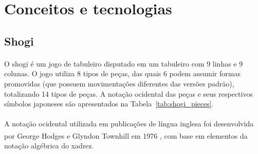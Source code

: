 \documentclass[a4paper, 11pt]{article}
\begin{document}
    \section{Conceitos e tecnologias}
    \subsection[Shogi]{Shogi}
    \paragraph{}
    O shogi é um jogo de tabuleiro disputado em um tabuleiro com 9 linhas e 9 colunas. O jogo utiliza 8 tipos de peças, das quais 6 podem assumir formas promovidas (que possuem movimentações diferentes das versões padrão), totalizando 14 tipos de peças. A notação ocidental das peças e seus respectivos símbolos japoneses são apresentados na Tabela~\ref{tab:shogi_pieces}.
    \paragraph{}
    A notação ocidental utilizada em publicações de língua inglesa foi desenvolvida por George Hodges e Glyndon Townhill em 1976 \textsuperscript{\cite{hodges-notation}}, com base em elementos da notação algébrica do xadrez. 
\end{document}
